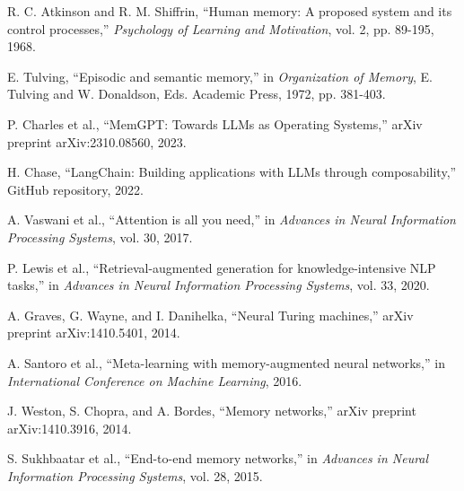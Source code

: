 \documentclass[journal]{IEEEtran}
\begin{document}
\begin{thebibliography}{10}

R. C. Atkinson and R. M. Shiffrin, ``Human memory: A proposed system and its control processes,'' \emph{Psychology of Learning and Motivation}, vol. 2, pp. 89-195, 1968.

E. Tulving, ``Episodic and semantic memory,'' in \emph{Organization of Memory}, E. Tulving and W. Donaldson, Eds. Academic Press, 1972, pp. 381-403.

P. Charles et al., ``MemGPT: Towards LLMs as Operating Systems,'' arXiv preprint arXiv:2310.08560, 2023.

H. Chase, ``LangChain: Building applications with LLMs through composability,'' GitHub repository, 2022.

A. Vaswani et al., ``Attention is all you need,'' in \emph{Advances in Neural Information Processing Systems}, vol. 30, 2017.

P. Lewis et al., ``Retrieval-augmented generation for knowledge-intensive NLP tasks,'' in \emph{Advances in Neural Information Processing Systems}, vol. 33, 2020.

A. Graves, G. Wayne, and I. Danihelka, ``Neural Turing machines,'' arXiv preprint arXiv:1410.5401, 2014.

A. Santoro et al., ``Meta-learning with memory-augmented neural networks,'' in \emph{International Conference on Machine Learning}, 2016.

J. Weston, S. Chopra, and A. Bordes, ``Memory networks,'' arXiv preprint arXiv:1410.3916, 2014.

S. Sukhbaatar et al., ``End-to-end memory networks,'' in \emph{Advances in Neural Information Processing Systems}, vol. 28, 2015.

\end{thebibliography}
\end{document}
